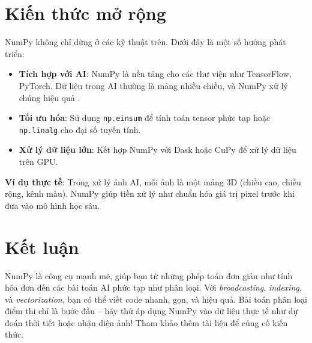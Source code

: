 \section{Kiến thức mở rộng}
NumPy không chỉ dừng ở các kỹ thuật trên. Dưới đây là một số hướng phát triển:
\begin{itemize}
  \item \textbf{Tích hợp với AI}: NumPy là nền tảng cho các thư viện như TensorFlow, PyTorch. Dữ liệu trong AI thường là mảng nhiều chiều, và NumPy xử lý chúng hiệu quả \cite{nguyen2025_numpy_arrays}.
  \item \textbf{Tối ưu hóa}: Sử dụng \texttt{np.einsum} để tính toán tensor phức tạp hoặc \texttt{np.linalg} cho đại số tuyến tính.
  \item \textbf{Xử lý dữ liệu lớn}: Kết hợp NumPy với Dask hoặc CuPy để xử lý dữ liệu trên GPU.
\end{itemize}

\textbf{Ví dụ thực tế}: Trong xử lý ảnh AI, mỗi ảnh là một mảng 3D (chiều cao, chiều rộng, kênh màu). NumPy giúp tiền xử lý như chuẩn hóa giá trị pixel trước khi đưa vào mô hình học sâu.

\section{Kết luận}
NumPy là công cụ mạnh mẽ, giúp bạn từ những phép toán đơn giản như tính hóa đơn đến các bài toán AI phức tạp như phân loại. Với \textit{broadcasting}, \textit{indexing}, và \textit{vectorization}, bạn có thể viết code nhanh, gọn, và hiệu quả. Bài toán phân loại điểm thi chỉ là bước đầu – hãy thử áp dụng NumPy vào dữ liệu thực tế như dự đoán thời tiết hoặc nhận diện ảnh! Tham khảo thêm tài liệu \cite{tiem2025, vinh2025} để củng cố kiến thức.
